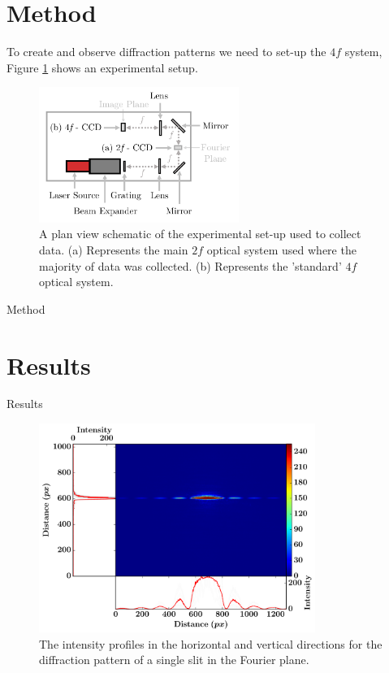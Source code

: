 \documentclass[twocolumn]{revtex4}
\begin{document}
\section{Method} 
\vspace{-2ex}
To create and observe diffraction patterns we need to set-up the $4f$ system, Figure \ref{m-fig1} shows an experimental setup. 
\begin{figure}[!h]
\begin{center}
\includegraphics[width=6.5cm]{method/fig1-1}
\caption[]{A plan view schematic of the experimental set-up used to collect data. (a) Represents the main $2f$ optical system used where the majority of data was collected. (b) Represents the 'standard' $4f$ optical system.}
\label{m-fig1}
\end{center}
\end{figure}

Method

\vspace{-3ex}
\section{Results}
\vspace{-2ex}

Results

\begin{figure}[!h]
\begin{center}
\includegraphics[width=9cm]{results/single_slit}
\caption[]{The intensity profiles in the horizontal and vertical directions for the diffraction pattern of a single slit in the Fourier plane.}
\end{center}
\end{figure}
\end{document}
